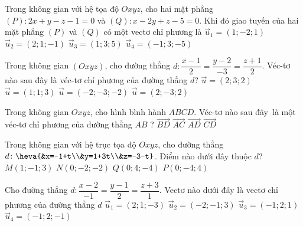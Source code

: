 \begin{ex}%
	Trong không gian với hệ tọa độ $Oxyz$, cho hai mặt phẳng $(P)\colon 2x+y-z-1=0$ và $(Q)\colon x-2y+z-5=0$. Khi đó giao tuyến của hai mặt phẳng $(P)$ và $(Q)$ có  một vectơ chỉ phương là
	\choice 
		 {$\overrightarrow{u}_1=(1;-2;1)$}
		{$\overrightarrow{u}_2=(2;1;-1)$} 
		 {\True $\overrightarrow{u}_3=(1;3;5)$}
		 {$\overrightarrow{u}_4=(-1;3;-5)$}
\end{ex}

\begin{ex}%
	Trong không gian $(Oxyz)$,  cho đường thẳng $d\colon \dfrac{x-1}{2}=\dfrac{y-2}{-3}=\dfrac{z+1}{2}$. Véc-tơ nào sau đây là véc-tơ chỉ phương của đường thẳng $d$?
	 \choice
		 {$\overrightarrow{u}=(2;3;2)$}
		{$\overrightarrow{u}=(1;1;3)$} 
		{$\overrightarrow{u}=(-2;-3;-2)$} 
		{\True $\overrightarrow{u}=(2;-3;2)$} 
\end{ex}

\begin{ex}%
	Trong không gian $ Oxyz$, cho hình bình hành $ABCD$. Véc-tơ  nào sau đây~là một véc-tơ chỉ phương của đường thẳng $AB$ ?
	 \choice
		{$\overrightarrow{{BD}}$} 
		 {$\overrightarrow{{AC}}$}
		{$\overrightarrow{{AD}}$} 
		{\True  $\overrightarrow{{CD}}$}
\end{ex}

\begin{ex}%
	Trong không  gian với hệ trục tọa độ $Oxyz$, cho đường thẳng $d\colon \heva{&x=-1+t\\&y=1+3t\\&z=-3-t}$. Điểm nào dưới đây thuộc $d$?
	 \choice
		{$M(1;-1; 3)$} 
		 {$N(0;-2;-2)$}
		{\True $Q(0;  4;-4)$}
		{$P(0;-4;  4)$}
\end{ex}

\begin{ex}%
	Cho đường thẳng $d\colon \dfrac{x-2}{-1}=\dfrac{y-1}{2}=\dfrac{z+3}{1}$. Vectơ nào dưới đây là vectơ chỉ phương của đường thẳng $d$ 
	 \choice
		 {$\overrightarrow{u}_1=(2; 1;-3)$}
		{$\overrightarrow{u}_2=(-2;-1; 3)$} 
		{\True $\overrightarrow{u}_3=(-1; 2;  1)$}
		{$\overrightarrow{u}_4=(-1;  2;-1)$}
\end{ex}

